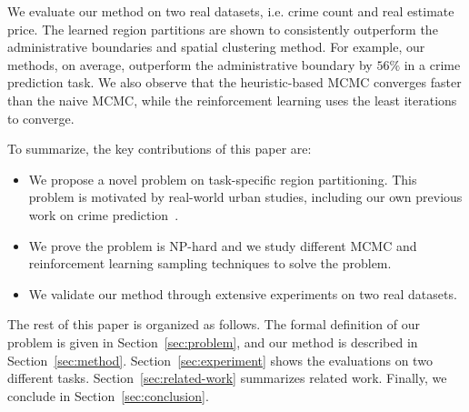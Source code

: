 We evaluate our method on two real datasets, i.e. crime count and real estimate price. The learned region partitions are shown to consistently outperform the administrative boundaries and spatial clustering method. For example, our methods, on average, outperform the administrative boundary by $56\%$ in a crime prediction task. We also observe that the heuristic-based MCMC converges faster than the naive MCMC, while the reinforcement learning uses the least iterations to converge.

To summarize, the key contributions of this paper are:
\begin{itemize}[leftmargin=*]
\item We propose a novel problem on task-specific region partitioning. This problem is motivated by real-world urban studies, including our own previous work on crime prediction~\cite{wang2016crime}.
\item We prove the problem is NP-hard and we study different MCMC and reinforcement learning sampling techniques to solve the problem. 
\item We validate our method through extensive experiments on two real datasets.
\end{itemize}


The rest of this paper is organized as follows. The formal definition of our problem is given in Section~\ref{sec:problem}, and our method is described in Section~\ref{sec:method}. Section~\ref{sec:experiment} shows the evaluations on two different tasks. Section~\ref{sec:related-work} summarizes related work.  Finally, we conclude in Section~\ref{sec:conclusion}.

